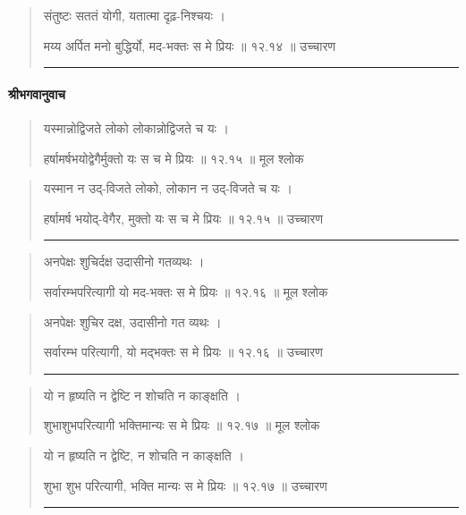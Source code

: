 \begin{quotation}

संतुष्टः सततं योगी, यतात्मा दृढ़-निश्चयः ।  

मय्य अर्पित मनो बुद्धिर्यो, मद-भक्तः स मे प्रियः  ॥ १२.१४ ॥  उच्चारण

\noindent\rule{16cm}{0.4pt} 
\end{quotation}

\paragraph{\sanskrit श्रीभगवानुवाच}

\begin{quotation} 


यस्मान्नोद्विजते लोको लोकान्नोद्विजते च यः ।  

हर्षामर्षभयोद्वेगैर्मुक्तो यः स च मे प्रियः  ॥ १२.१५ ॥  मूल श्लोक
\end{quotation}

\begin{quotation}

यस्मान न उद्-विजते लोको, लोकान न उद्-विजते च यः ।  

हर्षामर्ष भयोद्-वेगैर, मुक्तो यः स च मे प्रियः  ॥ १२.१५ ॥  उच्चारण

\noindent\rule{16cm}{0.4pt} 
\end{quotation}


\begin{quotation} 


अनपेक्षः शुचिर्दक्ष उदासीनो गतव्यथः ।  

सर्वारम्भपरित्यागी यो मद-भक्तः स मे प्रियः  ॥ १२.१६ ॥  मूल श्लोक
\end{quotation}

\begin{quotation}

अनपेक्षः शुचिर दक्ष, उदासीनो गत व्यथः ।  

सर्वारम्भ परित्यागी, यो मद्भक्तः स मे प्रियः  ॥ १२.१६ ॥  उच्चारण

\noindent\rule{16cm}{0.4pt} 
\end{quotation}


\begin{quotation} 

यो न हृष्यति न द्वेष्टि न शोचति न काङ्‍क्षति ।  

शुभाशुभपरित्यागी भक्तिमान्यः स मे प्रियः ॥ १२.१७ ॥  मूल श्लोक
\end{quotation}

\begin{quotation}

यो न हृष्यति न द्वेष्टि, न शोचति न काङ्‍क्षति ।  

शुभा शुभ परित्यागी, भक्ति मान्यः स मे प्रियः  ॥ १२.१७ ॥  उच्चारण

\noindent\rule{16cm}{0.4pt} 
\end{quotation}


